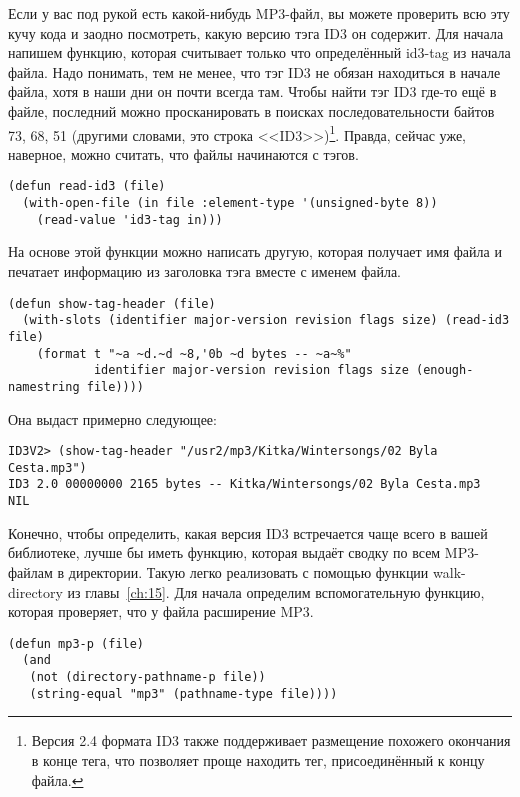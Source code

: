 Если у вас под рукой есть какой-нибудь MP3-файл, вы можете проверить всю эту кучу кода и
заодно посмотреть, какую версию тэга ID3 он содержит. Для начала напишем функцию, которая
считывает только что определённый id3-tag из начала файла. Надо понимать, тем не менее,
что тэг ID3 не обязан находиться в начале файла, хотя в наши дни он почти всегда там.
Чтобы найти тэг ID3 где-то ещё в файле, последний можно просканировать в поисках
последовательности байтов 73, 68, 51 (другими словами, это строка <<ID3>>)\footnote{Версия
    2.4 формата ID3 также поддерживает размещение похожего окончания в конце тега, что
позволяет проще находить тег, присоединённый к концу файла.}. Правда, сейчас уже,
наверное, можно считать, что файлы начинаются с тэгов.

\begin{lstlisting}
(defun read-id3 (file)
  (with-open-file (in file :element-type '(unsigned-byte 8))
    (read-value 'id3-tag in)))
\end{lstlisting}

На основе этой функции можно написать другую, которая получает имя файла и печатает
информацию из заголовка тэга вместе с именем файла.

\begin{lstlisting}
(defun show-tag-header (file)
  (with-slots (identifier major-version revision flags size) (read-id3 file)
    (format t "~a ~d.~d ~8,'0b ~d bytes -- ~a~%"
            identifier major-version revision flags size (enough-namestring file))))
\end{lstlisting}

Она выдаст примерно следующее:

\begin{lstlisting}[style=lisprepl]
ID3V2> (show-tag-header "/usr2/mp3/Kitka/Wintersongs/02 Byla Cesta.mp3")
ID3 2.0 00000000 2165 bytes -- Kitka/Wintersongs/02 Byla Cesta.mp3
NIL
\end{lstlisting}

Конечно, чтобы определить, какая версия ID3 встречается чаще всего в вашей библиотеке,
лучше бы иметь функцию, которая выдаёт сводку по всем MP3-файлам в директории. Такую легко
реализовать с помощью функции walk-directory из главы~\ref{ch:15}. Для начала определим
вспомогательную функцию, которая проверяет, что у файла расширение MP3.

\begin{lstlisting}
(defun mp3-p (file)
  (and
   (not (directory-pathname-p file))
   (string-equal "mp3" (pathname-type file))))
\end{lstlisting}

